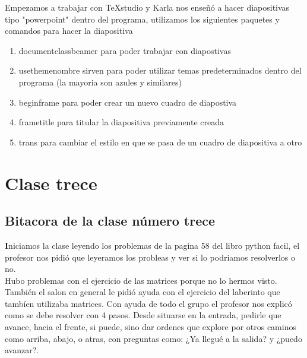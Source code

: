\documentclass{book}
\begin{document}
Empezamos a trabajar con TeXstudio y Karla nos enseñó a hacer diapositivas tipo "powerpoint" dentro del programa, utilizamos los siguientes paquetes y comandos para hacer la diapositiva
\begin{enumerate}
	\item \color{green} documentclass{beamer} \color{orange} para poder trabajar con diapostivas \color{black}
	\item \color{green} usetheme{nombre} \color{orange} sirven para poder utilizar temas predeterminados dentro del programa (la mayoria son azules y similares) \color{black}
	\item \color{green} begin{frame} \color{orange} para poder crear un nuevo cuadro de diapostiva \color{black}
	\item \color{green} frametitle \color{orange} para titular la diapositiva previamente creada \color{black}
	\item \color{green} trans \color{orange} para cambiar el estilo en que se pasa de un cuadro de diapositiva a otro \color{black}
\end{enumerate}

\chapter{Clase trece}
\section{Bitacora de la clase número trece}

\textbf Iniciamos la clase leyendo los problemas de la pagina 58 del libro python facil, el profesor nos pidió que leyeramos los probleas y ver si lo podriamos resolverlos o no.\\
Hubo problemas con el ejercicio de las matrices porque no lo hermos visto.\\ 
También el salon en general le pidió ayuda con el ejercicio del laberinto que tambíen utilizaba matrices. Con ayuda de todo el grupo el profesor nos explicó como se debe resolver con 4 pasos. Desde situarse en la entrada, pedirle que avance, hacia el frente, si puede, sino dar ordenes que explore por otros caminos como arriba, abajo, o atras, con preguntas como: ¿Ya llegué a la salida? y ¿puedo avanzar?.\\
\end{document}
